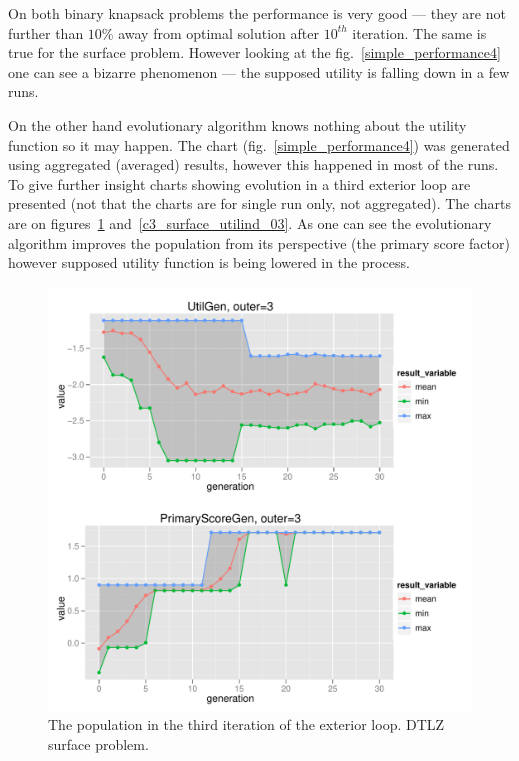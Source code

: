 On both binary knapsack problems the performance is very good --- they are not
further than $10\%$ away from optimal solution after $10^{th}$ iteration. The
same is true for the surface problem. However looking at the
fig.~\ref{simple_performance4} one can see a bizarre phenomenon --- the
supposed utility is falling down in a few runs.

On the other hand evolutionary algorithm knows nothing about the utility
function so it may happen. The chart (fig.~\ref{simple_performance4}) was
generated using aggregated (averaged) results, however this happened in most
of the runs. To give further insight charts showing evolution in a third
exterior loop are presented (not that the charts are for single run only, not
aggregated). The charts are on figures~\ref{c3_surface_utilgen_03}
and~\ref{c3_surface_utilind_03}. As one can see the evolutionary algorithm
improves the population from its perspective (the primary score factor)
however supposed utility function is being lowered in the process.

\begin{figure}
  \centering
  \includegraphics[width=1.0\textwidth]{exp/nouncert/c3_surface_utilgen_03}
  \caption{The population in the third iteration of the exterior loop. DTLZ
    surface problem.}
  \label{c3_surface_utilgen_03}
\end{figure}

